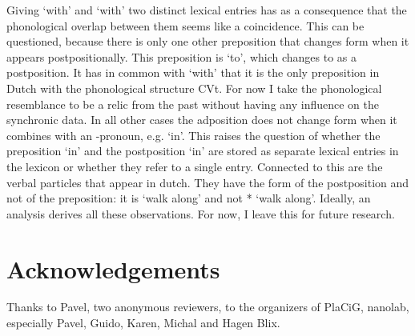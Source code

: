 \documentclass[11pt,a4paper]{article}
\begin{document}
Giving  `with' and  `with' two distinct lexical entries has as a consequence that the phonological overlap between them seems like a coincidence. This can be questioned, because there is only one other preposition that changes form when it appears postpositionally. This preposition is  `to', which changes to  as a postposition. It has in common with  `with' that it is the only preposition in Dutch with the phonological structure CVt. For now I take the phonological resemblance to be a relic from the past without having any influence on the synchronic data. In all other cases the adposition does not change form when it combines with an -pronoun, e.g.  `in'. This raises the question of whether the preposition  `in' and the postposition  `in' are stored as separate lexical entries in the lexicon or whether they refer to a single entry. Connected to this are the verbal particles that appear in dutch. They have the form of the postposition and not of the preposition: it is  `walk along' and not * `walk along'. Ideally, an analysis derives all these observations.
For now, I leave this for future research.

\printbibliography

\section*{Acknowledgements}

Thanks to Pavel, two anonymous reviewers, to the organizers of PlaCiG, nanolab, especially Pavel, Guido, Karen, Michal and Hagen Blix.
\end{document}
